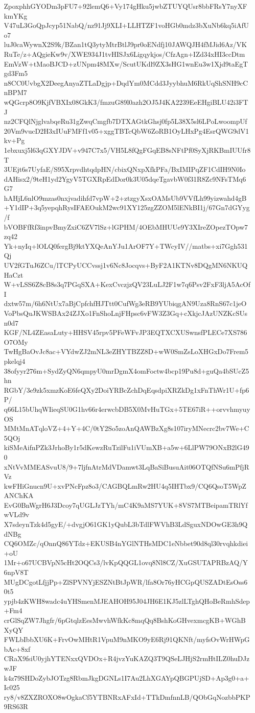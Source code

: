 ZpoxphhGYODm3pFU7+92lemQ6+Vy174gHku5jwbZTUYQUsr8bbFRsY7nyXFkmYKg
V47uL3GoQpJcyp51NabQ/nz91Jj9XLI+LLHTZF1voHGb0mdz3bXuNb6kq5iAfUo7
luJ0caWywnX2S9k/BZan1tQ3ytyMtrBtlJ9pr0oENdfj10JAWQJH4fMJid6Az/VK
RuTe/z+AQgieKw9v/XWE934J1tvHISJx6Ligqykjos/CfzAgn+IZd34xHI3ccDtm
EmVzW+tMaoBJCD+zUNpm48MXw/ScutUKdl9ZX3sHG1wnEu3w1Xjd9taEgTgd3Fm5
n8CC0UvbgX2DeegAnyaZTLaDgjp+DqdYm0MCdd3JyybhuM6RkUqShSNH9cCnBPM7
wQGcrp8O9KjfVBXIx08GkK3/fmzuG89l0azh2OJ5J4KA2239EeEHgiBLU42i3FTJ
nz2CFQlNjglvabqeRu31gZwqCmgfb7DTXAGtkGhsj0fp5L38X5sl6LPoLwoompUf
20Vm9vucD2H3xIUuFMFf1v05+xggTBTcQbW6ZoRB1OyLHxPg4EsrQWG9dV1kv+Pg
1ebxuxj5l63qGXYJDV+v947C7x5/VH5L8fQgFGqEB8sNFtPf0SyXjRKBmIUUfr8T
3UEjt6s7UyfaE/S95XrpvdhtqdpHN/cbixQNxpXfkPFa/BxIMIPqZF1CdIH9N0Io
dAHisx2/9teH1yd2YgyV5TGXRpEdDor0k3U05dqeTgavbW0f31R8Zc9NFsTMq6G7
hAHjL6nlO9mzas0nxjvadihfd7vpW+2+ztzgyXsxOAMsUb9VVfLh99yizwahd4gB
+Y1dIP+3q5yepqhRysIFAEOukM2wc91XY125zgZZOM5lENkBI1j/67Gn7dGYyg/f
bVOBFfRf3inpvBmyZxiC6ZV7lSz+lGPHM/4OEbMHUUe9Y3XIreZOpezTOpw7zq42
Yk+nyIq+lOLQ0fergBj9ktYXQeAnYJu1ArOF7Y+TWcyIV//matbs+xi7Ggh531Qj
UV2fGTuJ6ZCu/lTCPyUCCvssj1v6Nc8Jocqvs+ByF2A1KTNv8DQgMN6NKUQHaCzt
W+vLSS6Z8cB8s3q7PGqSXA+KexCvczjzQV23LuLJ2F1w7q6Psv2FxF3ljA5AcOfI
dxtw57m/6h6NtUx7aBjCpfchfHJTtt0CufWg3eRB9YUbiqgAN9Uza8RnS67c1jeO
VoPbsQuJKWSBAx24ZJXo1FnShoLnjFHpsc6vFW3Z3Gq+cXkjcJAzUNZKcSUsn0d7
KGF/NL4ZEasaLuty+HHSV45rpv5PFeWFvJP3EQTXCXUSwnsfPLECe7XS786O7OMy
TwHgBaOvJc8ac+VYdwZJ2mNL3eZHYTBZZ8D+wW0SmZsLoXHGxDo7Frem5pkelqj4
38ofyyr276m+SydZyQN6qmpyU0mrDgmX4omFoctw4bcp19Pu8d+guQa4bSUcZ5hn
RGbY/3e9zk5xmzKoE6feQXy2DoiYRBcZchDqEqsdpiXRZkDg1xFnThWr1U+fp6P/
q66L15bUhqWIieqSU0G1hv66r4erwcbDB5X0MvHuTGx+5TE67iR++orvvhmyuyOS
MMtMnATqloVZ+4+Y+4C/0tY2So5zoAnQAWBzXg8s107iryMNecrc2bv7We+C5QOj
kiSMeAifnPZk3JrhoBy1r5dKewzRuTzilFu1iVUmXB+a5w+6LlPW79ONxB2lG490
xNtVvMMEASvuU8/9+7ljfnAtrMdVDamwt3LqBaSiBusuAit06OTQfNSu6mPfjRVz
kwFHiGnucn9U+xvPNcFpz8o3/CAGBQLmRw2HU4q5IHTbx9/CQ6QsoT5WpZANChKA
EvG0BnWgrH6J3Dcoy7qUGLJzTYh/mC4K9aMS7YUK+8VS7MTBeipamTRlYfwVLd9v
X7sdeynTzk4d5gyE/+dvgjO61GK1yQubL3bTdlFWVhB3LdSguxNDOwGE3h9QdNBg
CQ6OMZc/qOnnQ86YTdz+EKUSB4nYGlNTHsMDC1eNbbet90d8ql30rvqhkdiei+oU
1Mr+o67UCBVpN5cHt2OQCs3/lvKpQQGL1ovq8Nl8CZ/XuGSUTAPRBzAQ/Y6npV8T
MUgDCgotLfjjPp+ZlSPVNYjESZNtBtJpWR/lfa8Or76yHCGpQUSZADtEsOss60t5
ypjb4zKWH8wadc4uYHSmenMJEAHOH95J04JH6E1KJ5zlLTghQHoBeRmhSdep+Fm4
crGlSqZW7Jhgfr/6pGtqlzEesMwvhWfkKc8mqQq8BshKoGHvexmcgKB+WGhBXyQY
FWLbIbbXU6K+FrvOwMHtR1VpuM9nMKO9yE6Rj91QKNft/myfsOvWrHWpGbAc+8xf
CRaX9fsiU0yjhYTENxxQVDOx+R4jvzYuKAZQ3T9QSeLJHjS2rmHtILZ0huDJzwJF
k4z79SHDoZybJOTzg8RbmJkgDGNLs1I7Au2LhXGAYpQBGPUjSD+Ap3g0+a+Ic025
ry8/v8ZXZROXO8wOgkaCf5YTBNRxAFxId+TTkDmfnnLB/QObGqNozbbPKP9RS63R
